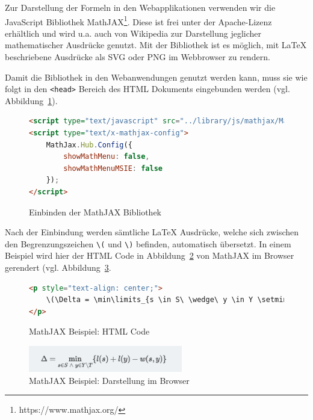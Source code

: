 Zur Darstellung der Formeln in den Webapplikationen verwenden wir die JavaScript Bibliothek MathJAX\footnote{https://www.mathjax.org/}. Diese ist frei unter der Apache-Lizenz erhältlich und wird u.a. auch von Wikipedia zur Darstellung jeglicher mathematischer Ausdrücke genutzt. Mit der Bibliothek ist es möglich, mit LaTeX beschriebene Ausdrücke als SVG oder PNG im Webbrowser zu rendern. 

Damit die Bibliothek in den Webanwendungen genutzt werden kann, muss sie wie folgt in den \texttt{<head>} Bereich des HTML Dokuments eingebunden werden (vgl. Abbildung~\ref{fig:listing-mathjax-include}).

\begin{figure}[h!]
\begin{lstlisting}[language=HTML]
<script type="text/javascript" src="../library/js/mathjax/MathJax.js?config=TeX-AMS-MML_SVG.js&locale=de"></script>
<script type="text/x-mathjax-config">
	MathJax.Hub.Config({
		showMathMenu: false,
		showMathMenuMSIE: false
	});
</script>
\end{lstlisting}
\caption[MathJAX: Einbindung]{Einbinden der MathJAX Bibliothek}\label{fig:listing-mathjax-include}
\end{figure}

Nach der Einbindung werden sämtliche LaTeX Ausdrücke, welche sich zwischen den Begrenzungszeichen \texttt{\textbackslash(} und \texttt{\textbackslash)} befinden, automatisch übersetzt. In einem Beispiel wird hier der HTML Code in Abbildung~\ref{fig:listing-mathjax-example-html} von MathJAX im Browser gerendert (vgl. Abbildung~\ref{fig:mathjax-example-img}.

\begin{figure}[h!]
\begin{lstlisting}[language=HTML]
<p style="text-align: center;">
	\(\Delta = \min\limits_{s \in S\ \wedge\ y \in Y \setminus T}\{l(s) + l(y) - w(s,y)\}\)
</p>
\end{lstlisting}
\caption[MathJAX: Beispiel Code]{MathJAX Beispiel: HTML Code}\label{fig:listing-mathjax-example-html}
\end{figure}

\begin{figure}[h!]
	\centering
	\includegraphics[width=0.6\textwidth]{figures/mathjax-example}
	\caption[MathJAX: Beispiel im Browser]{MathJAX Beispiel: Darstellung im Browser}\label{fig:mathjax-example-img}
\end{figure}

